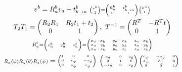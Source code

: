 {\tiny \begin{gather*}
	v^b = R_a^b v_a + t^b_{b\to a} 
	~
	{\tiny\scriptstyle \begin{pmatrix}
	v^b \\ 1
	\end{pmatrix}
	= \begin{pmatrix}
	R_a^b & t^b_{b\to a} \\
	0 & 1
	\end{pmatrix}
	\begin{pmatrix}
	v^a \\ 1
	\end{pmatrix}}
	\\
	T_2T_1 = \begin{pmatrix}
	R_2R_1 & R_2t_1+t_2 \\ 0 & 1
	\end{pmatrix}, ~ T^{-1} = \begin{pmatrix}
	R^T & -R^Tt \\ 0 & 1
	\end{pmatrix}\\
	{\tiny\scriptstyle R_a^b=\begin{pmatrix}
		 &  &  \\
		x_a^b & y_a^b & z_a^b \\
		 &  &  
		\end{pmatrix}=
	\begin{pmatrix}
	x_a\cdot x_b & y_a\cdot x_b & z_a\cdot x_b \\
	x_a\cdot y_b & y_a\cdot y_b & z_a\cdot y_b \\
	x_a\cdot z_b & y_a\cdot z_b & z_a\cdot z_b
	\end{pmatrix}}%
	\\
	{\tiny {\scriptstyle R_x(\phi) R_y(\theta) R_z(\psi) }= 
	\begin{pmatrix}
		1 & 0 & 0 \\ 
		0 & c_\phi & -s_\phi \\
		0 & s_\phi & c_\phi 
	\end{pmatrix}~
	\begin{pmatrix}
		c_\theta & 0 & s_\theta \\ 
		0 & 1 & 0 \\
		-s_\theta & 0 & c_\theta
	\end{pmatrix}
	\begin{pmatrix}
		c_\psi & -s_\psi & 0 \\ 
		s_\psi & c_\psi & 0 \\
		0 & 0 & 1 
	\end{pmatrix}~
	} \\

\end{gather*}}
